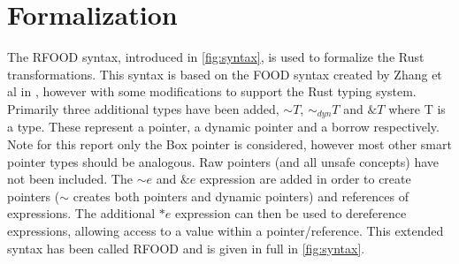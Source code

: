 \documentclass[ oneside,%
                    author={James Elgar},
                    degree={MEng},
                     title={Bidirectional transformer between functional and \\ object-oriented programming in Rust},
                  subtitle={}]{dissertation}
\newcommand{\weixin}{Zhang et al }
\begin{document}



\section{Formalization}

The RFOOD syntax, introduced in \autoref{fig:syntax}, is used to formalize the Rust transformations. This syntax is based on the FOOD syntax created by \weixin in \cite{food}, however with some modifications to support the Rust typing system. Primarily three additional types have been added, $\sim T$, $\sim_{dyn} T$ and $\& T$ where T is a type. These represent a pointer, a dynamic pointer and a borrow respectively. Note for this report only the Box pointer is considered, however most other smart pointer types should be analogous. Raw pointers (and all unsafe concepts) have not been included. The $\sim e$ and $\& e$ expression are added in order to create pointers ($\sim$ creates both pointers and dynamic pointers) and references of expressions. The additional $*e$ expression can then be used to dereference expressions, allowing access to a value within a pointer/reference. This extended syntax has been called RFOOD and is given in full in \autoref{fig:syntax}. 

\end{document}
